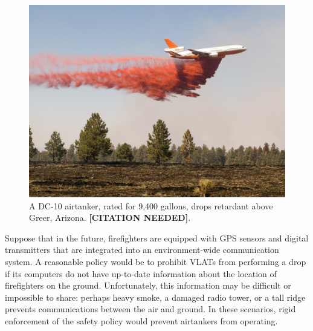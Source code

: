 \documentclass[]             %
{NASA}                       %
\theoremstyle{definition}
\newcommand{\citationneeded}{\textbf{[CITATION NEEDED]}}
\begin{document}
\begin{figure}[h]
  \label{fig:airtanker}
  \centering
  \includegraphics[scale=0.4]{images/dc10.jpg}
  \caption{A DC-10 airtanker, rated for 9,400 gallons, drops retardant above Greer, Arizona. \citationneeded.}
\end{figure}

Suppose that in the future, firefighters are equipped with GPS sensors
and digital transmitters that are integrated into an environment-wide
communication system. A reasonable policy would be to prohibit VLATs
from performing a drop if its computers do not have up-to-date
information about the location of firefighters on the
ground. Unfortunately, this information may be difficult or impossible
to share: perhaps heavy smoke, a damaged radio tower, or a tall ridge
prevents communications between the air and ground. In these
scenarios, rigid enforcement of the safety policy would prevent
airtankers from operating.
\end{document}
